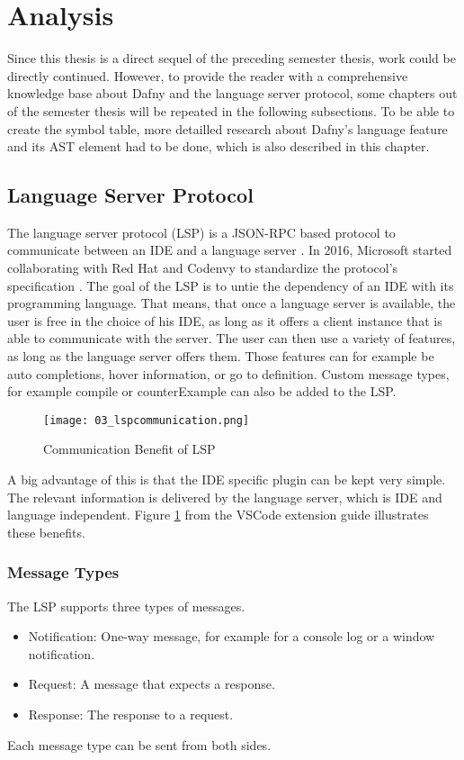 \section{Analysis}
\label{section:analysis}
Since this thesis is a direct sequel of the preceding semester thesis, work could be directly continued. However, to provide the reader with a comprehensive knowledge base about Dafny and the language server protocol, some chapters out of the semester thesis will be repeated in the following subsections. To be able to create the symbol table, more detailled research about Dafny's language feature and its AST element had to be done, which is also described in this chapter.

\subsection{Language Server Protocol}
\label{section:analysis:lsp}
The language server protocol (LSP) is a JSON-RPC based protocol to communicate between an IDE and a language server \cite{dafnyWiki}. In 2016, Microsoft started collaborating with Red Hat and Codenvy to standardize the protocol’s specification \cite{dafnyWiki}. The goal of the LSP is to untie the dependency of an IDE with its programming language. That means, that once a language server is available, the user is free in the choice of his IDE, as long as it offers a client instance that is able to communicate with the server. The user can then use a variety of features, as long as the language server offers them. Those features can for example be auto completions, hover information, or go to definition. Custom message types, for example compile or counterExample can also be added to the LSP. \cite{dafnyWiki}
\begin{figure}[h]
    \centering
    \texttt{[image: 03\_lspcommunication.png]}
    \caption{Communication Benefit of LSP}
    \label{fig:lspcommunication}
\end{figure}
A big advantage of this is that the IDE specific plugin can be kept very simple. The relevant information is delivered by the language server, which is IDE and language independent. Figure \ref{fig:lspcommunication} from the VSCode extension guide illustrates these benefits. \cite{lspextensionguide}

\subsubsection{Message Types}
The LSP supports three types of messages.
\begin{itemize}
    \item Notification: One-way message, for example for a console log or a window notification.
    \item Request: A message that expects a response.
    \item Response: The response to a request.
\end{itemize}
Each message type can be sent from both sides.

